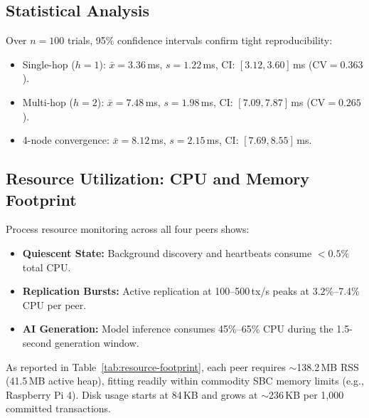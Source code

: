 \subsection{Statistical Analysis}
\label{sec:eval-statistics}
Over $n=100$ trials, 95\% confidence intervals confirm tight reproducibility:
\begin{itemize}
    \item Single-hop ($h=1$): $\bar{x} = 3.36$\,ms, $s = 1.22$\,ms, CI: $[3.12, 3.60]$\,ms ($\text{CV} = 0.363$).
    \item Multi-hop ($h=2$): $\bar{x} = 7.48$\,ms, $s = 1.98$\,ms, CI: $[7.09, 7.87]$\,ms ($\text{CV} = 0.265$).
    \item 4-node convergence: $\bar{x} = 8.12$\,ms, $s = 2.15$\,ms, CI: $[7.69, 8.55]$\,ms.
\end{itemize}

\subsection{Resource Utilization: CPU and Memory Footprint}
\label{sec:eval-resources}

Process resource monitoring across all four peers shows:
\begin{itemize}
    \item \textbf{Quiescent State:} Background discovery and heartbeats consume $<0.5\%$ total CPU.
    \item \textbf{Replication Bursts:} Active replication at 100--500\,tx/s peaks at 3.2\%--7.4\% CPU per peer.
    \item \textbf{AI Generation:} Model inference consumes 45\%--65\% CPU during the 1.5-second generation window.
\end{itemize}
As reported in Table~\ref{tab:resource-footprint}, each peer requires $\sim$138.2\,MB RSS (41.5\,MB active heap), fitting readily within commodity SBC memory limits (e.g., Raspberry Pi 4). Disk usage starts at 84\,KB and grows at $\sim$236\,KB per 1{,}000 committed transactions.

